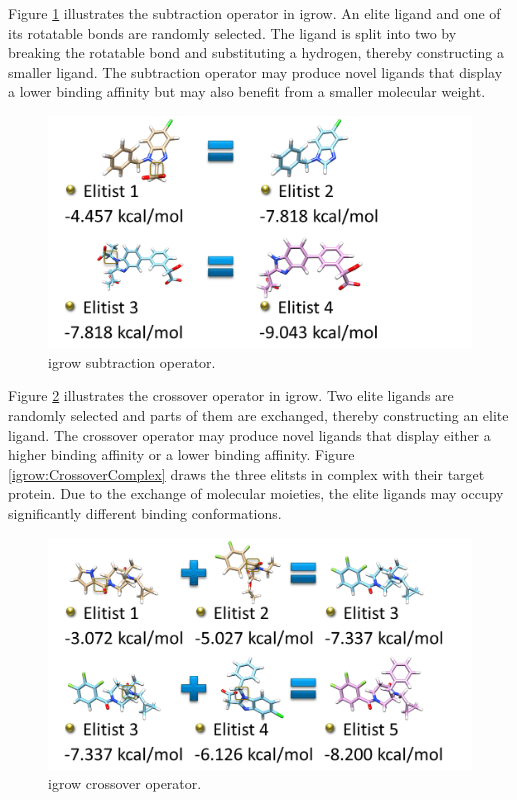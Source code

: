 \documentclass[10pt, conference, compsocconf]{IEEEtran}
\begin{document}
Figure \ref{igrow:Subtraction} illustrates the subtraction operator in igrow. An elite ligand and one of its rotatable bonds are randomly selected. The ligand is split into two by breaking the rotatable bond and substituting a hydrogen, thereby constructing a smaller ligand. The subtraction operator may produce novel ligands that display a lower binding affinity but may also benefit from a smaller molecular weight.

\begin{figure}
\centering
\includegraphics[width=\textwidth]{../igrow/Subtraction.png}
\caption{igrow subtraction operator.}
\label{igrow:Subtraction}
\end{figure}

Figure \ref{igrow:Crossover} illustrates the crossover operator in igrow. Two elite ligands are randomly selected and parts of them are exchanged, thereby constructing an elite ligand. The crossover operator may produce novel ligands that display either a higher binding affinity or a lower binding affinity. Figure \ref{igrow:CrossoverComplex} draws the three elitsts in complex with their target protein. Due to the exchange of molecular moieties, the elite ligands may occupy significantly different binding conformations.

\begin{figure}
\centering
\includegraphics[width=\textwidth]{../igrow/Crossover.png}
\caption{igrow crossover operator.}
\label{igrow:Crossover}
\end{figure}
\end{document}
